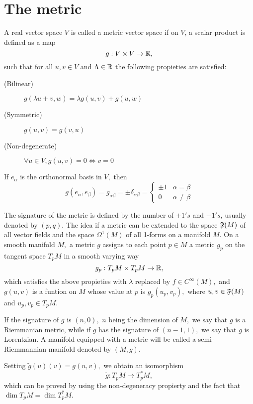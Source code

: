 \section{The metric}

\begin{defn}
 \label{SA:3.1.1}
 A real vector space $V$ is called a metric vector space if on $ V $, a scalar product is defined as a map
 $$ 
 g:V \times V \to \mathbb R, 
  $$
such that for all $ u,v \in V $ and $ \Lambda \in \mathbb R $ the following propieties are satisfied:
\begin{description}
  \item[(Bilinear)] $g(\lambda u+v, w)= \lambda g(u,v)+ g(u,w) $
  \item[(Symmetric)] $g(u,v)=g(v,u)$
  \item[(Non-degenerate)] $\forall u \in V,g(u,v)=0 \Longleftrightarrow v=0$
\end{description}
If $e_{\alpha}$ is the orthonormal basis in $V,$ then
\begin{equation}
\label{SA:3.1}
g(e_{\alpha}, e_{\beta})=g_{\alpha \beta}=\pm\delta_{\alpha \beta}=
\begin{cases}
\pm 1 & \alpha=\beta \\
0 & \alpha\neq \beta
\end{cases}
\end{equation}
\end{defn}

The signature of the metric is defined by the number of $+1's$ and $-1's$, usually denoted by $(p,q).$ The idea if a
metric can be extended to the space $\mathfrak{F}(M)$ of all vector fields and the space $\Omega^{1}(M)$ of all 1-forms on a
manifold $M.$ On a smooth manifold $M,$ a metric $g$ assigns to each point $p \in M$ a metric $g_{p}$ on the tangent
space $T_{p}M$ in a smooth varying way
\[
g_{p}:T_{p}M \times T_{p}M \to \mathbb R,
\] 
which satisfies the above propieties with $\lambda$ replaced by $f \in C^{\infty}(M),$ and $g(u,v)$ is a funtion on $M$
whose value at $p$ is $g_{p}(u_{p},v_{p}),$ where $u,v \in \mathfrak{F}(M)$ and $u_{p},v_{p}\in T_{p}M.$

If the signature of $g$ is $(n,0),$ $n$ being the dimension of $M,$ we say that $g$ is a Riemmanian metric, while if $g$
has the signature of $(n-1,1),$ we say that $g$ is Lorentzian. A manifold equipped with a metric will be called a
semi-Riemmannian manifold denoted by $(M, g).$

Setting $\tilde{g}(u)(v)=g(u,v),$ we obtain an isomorphism
\begin{equation}
\label{SA:3.2}
\tilde{g}:T_{p}M \to T_{p}^{*}M,
\end{equation}
which can be proved by using the non-degeneracy propierty and the fact that $\dim T_{p}M= \dim T_{p}^{*}M. $ 

